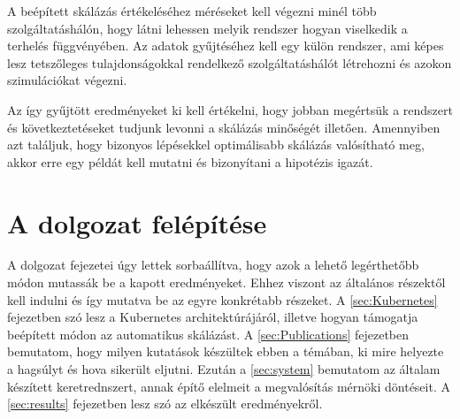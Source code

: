 A beépített skálázás értékeléséhez méréseket kell végezni minél több szolgáltatáshálón, hogy látni lehessen melyik rendszer hogyan viselkedik a terhelés függvényében. Az adatok gyűjtéséhez kell egy külön rendszer, ami képes lesz tetszőleges tulajdonságokkal rendelkező szolgáltatáshálót létrehozni és azokon szimulációkat végezni.

Az így gyűjtött eredményeket ki kell értékelni, hogy jobban megértsük a rendszert és következtetéseket tudjunk levonni a skálázás minőségét illetően. Amennyiben azt találjuk, hogy bizonyos lépésekkel optimálisabb skálázás valósítható meg, akkor erre egy példát kell mutatni és bizonyítani a hipotézis igazát. 


\section{A dolgozat felépítése}
A dolgozat fejezetei úgy lettek sorbaállítva, hogy azok a lehető legérthetőbb módon mutassák be a kapott eredményeket. Ehhez viszont az általános részektől kell indulni és így mutatva be az egyre konkrétabb részeket. 
A \ref{sec:Kubernetes} fejezetben szó lesz a Kubernetes architektúrájáról, illetve hogyan támogatja beépített módon az automatikus skálázást. 
A \ref{sec:Publications} fejezetben bemutatom, hogy milyen kutatások készültek ebben a témában, ki mire helyezte a hagsúlyt és hova sikerült eljutni.
Ezután a \ref{sec:system} bemutatom az általam készített keretrednszert, annak építő elelmeit a megvalósítás mérnöki döntéseit. 
A \ref{sec:results} fejezetben lesz szó az elkészült eredményekről.

